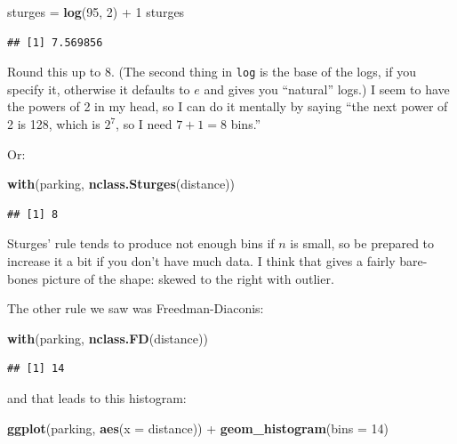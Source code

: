 \documentclass[]{tufte-book}
\newenvironment{Shaded}{}{}
\newcommand{\DataTypeTok}[1]{\textcolor[rgb]{0.56,0.13,0.00}{#1}}
\newcommand{\DecValTok}[1]{\textcolor[rgb]{0.25,0.63,0.44}{#1}}
\newcommand{\KeywordTok}[1]{\textcolor[rgb]{0.00,0.44,0.13}{\textbf{#1}}}
\newcommand{\NormalTok}[1]{#1}
\newcommand{\OperatorTok}[1]{\textcolor[rgb]{0.40,0.40,0.40}{#1}}
\newcommand{\StringTok}[1]{\textcolor[rgb]{0.25,0.44,0.63}{#1}}
\theoremstyle{definition}
\theoremstyle{definition}
\theoremstyle{definition}
\theoremstyle{remark}
\begin{document}
\begin{Shaded}
\begin{Highlighting}[]
\NormalTok{sturges =}\StringTok{ }\KeywordTok{log}\NormalTok{(}\DecValTok{95}\NormalTok{, }\DecValTok{2}\NormalTok{) }\OperatorTok{+}\StringTok{ }\DecValTok{1}
\NormalTok{sturges}
\end{Highlighting}
\end{Shaded}

\begin{verbatim}
## [1] 7.569856
\end{verbatim}

Round this up to 8. (The second thing in \texttt{log} is the base of the
logs, if you specify it, otherwise it defaults to \(e\) and gives you
``natural'' logs.) I seem to have the powers of 2 in my head, so I can
do it mentally by saying ``the next power of 2 is 128, which is \(2^7\),
so I need \(7+1=8\) bins.''

Or:

\begin{Shaded}
\begin{Highlighting}[]
\KeywordTok{with}\NormalTok{(parking, }\KeywordTok{nclass.Sturges}\NormalTok{(distance))}
\end{Highlighting}
\end{Shaded}

\begin{verbatim}
## [1] 8
\end{verbatim}

Sturges' rule tends to produce not enough bins if \(n\) is small, so be
prepared to increase it a bit if you don't have much data. I think that
gives a fairly bare-bones picture of the shape: skewed to the right with
outlier.

The other rule we saw was Freedman-Diaconis:

\begin{Shaded}
\begin{Highlighting}[]
\KeywordTok{with}\NormalTok{(parking, }\KeywordTok{nclass.FD}\NormalTok{(distance))}
\end{Highlighting}
\end{Shaded}

\begin{verbatim}
## [1] 14
\end{verbatim}

and that leads to this histogram:

\begin{Shaded}
\begin{Highlighting}[]
\KeywordTok{ggplot}\NormalTok{(parking, }\KeywordTok{aes}\NormalTok{(}\DataTypeTok{x =}\NormalTok{ distance)) }\OperatorTok{+}\StringTok{ }\KeywordTok{geom_histogram}\NormalTok{(}\DataTypeTok{bins =} \DecValTok{14}\NormalTok{)}
\end{Highlighting}
\end{Shaded}
\end{document}
